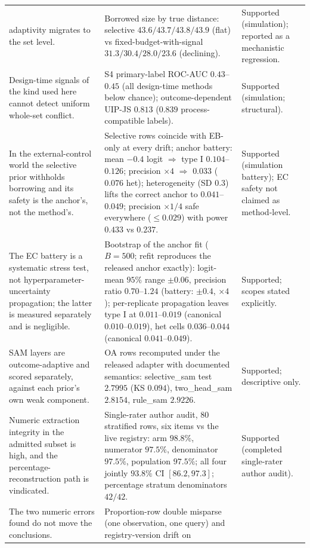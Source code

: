 \documentclass[11pt]{article}
\begin{document}
\begin{longtable}{p{} p{} p{}}
adaptivity migrates to the set level. & Borrowed size by true distance:
selective $43.6/43.7/43.8/43.9$ (flat) vs fixed-budget-with-signal
$31.3/30.4/28.0/23.6$ (declining). & Supported (simulation); reported as a
mechanistic regression. \\
Design-time signals of the kind used here cannot detect uniform whole-set
conflict. & S4 primary-label ROC-AUC $0.43$--$0.45$ (all design-time methods
below chance); outcome-dependent UIP-JS $0.813$ ($0.839$ process-compatible
labels). & Supported (simulation; structural). \\
In the external-control world the selective prior withholds borrowing and
its safety is the anchor's, not the method's. & Selective rows coincide with
EB-only at every drift; anchor battery: mean $-0.4$ logit $\Rightarrow$
type I $0.104$--$0.126$; precision $\times4$ $\Rightarrow$ $0.033$
($0.076$ het); heterogeneity (SD $0.3$) lifts the correct anchor to
$0.041$--$0.049$; precision $\times1/4$ safe everywhere ($\le0.029$) with
power $0.433$ vs $0.237$. & Supported (simulation battery); EC safety not
claimed as method-level. \\
The EC battery is a systematic stress test, not hyperparameter-uncertainty
propagation; the latter is measured separately and is negligible. &
Bootstrap of the anchor fit ($B=500$; refit reproduces the released anchor
exactly): logit-mean $95\%$ range $\pm 0.06$, precision ratio
$0.70$--$1.24$ (battery: $\pm 0.4$, $\times 4$); per-replicate propagation
leaves type I at $0.011$--$0.019$ (canonical $0.010$--$0.019$), het cells
$0.036$--$0.044$ (canonical $0.041$--$0.049$). & Supported; scopes stated
explicitly. \\
SAM layers are outcome-adaptive and scored separately, against each prior's
own weak component. & OA rows recomputed under the released adapter with
documented semantics: selective\_sam test $2.7995$ (KS $0.094$), two\_head\_sam
$2.8154$, rule\_sam $2.9226$. & Supported; descriptive only. \\
Numeric extraction integrity in the admitted subset is high, and the
percentage-reconstruction path is vindicated. & Single-rater author audit, 80 stratified
rows, six items vs the live registry: arm $98.8\%$, numerator $97.5\%$,
denominator $97.5\%$, population $97.5\%$; all four jointly $93.8\%$ CI
$[86.2,97.3]$; percentage stratum denominators $42/42$. & Supported
(completed single-rater author audit). \\
The two numeric errors found do not move the conclusions. & Proportion-row
double misparse (one observation, one query) and registry-version drift on

\end{longtable}
\end{document}
